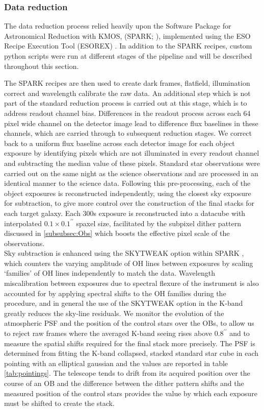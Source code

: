 \documentclass[fleqn,usenatbib]{mn2e}
\begin{document}
\subsubsection{Data reduction}\label{subsubsec:datareduction}
The data reduction process relied heavily upon the Software Package for Astronomical Reduction with KMOS, (SPARK; \cite{Davies2013}), implemented using the ESO Recipe Execution Tool (ESOREX) \citep{Freudling2013}.
In addition to the SPARK recipes, custom python scripts were run at different stages of the pipeline and will be described throughout this section.

The SPARK recipes are then used to create dark frames, flatfield, illumination correct and wavelength calibrate the raw data.
An additional step which is not part of the standard reduction process is carried out at this stage, which is to address readout channel bias.
Differences in the readout process across each 64 pixel wide channel on the detector image lead to difference flux baselines in these channels, which are carried through to subsequent reduction stages.
We correct back to a uniform flux baseline across each detector image for each object exposure by identifying pixels which are not illuminated in every readout channel and subtracting the median value of these pixels.
Standard star observations were carried out on the same night as the science observations and are processed in an identical manner to the science data.
Following this pre-processing, each of the object exposures is reconstructed independently, using the closest sky exposure for subtraction, to give more control over the construction of the final stacks for each target galaxy.
Each 300s exposure is reconstructed into a datacube with interpolated $0.1\times0.1^{\prime\prime}$ spaxel size, facilitated by the subpixel dither pattern discussed in \cref{subsubsec:Obs} which boosts the effective pixel scale of the observations. \\

Sky subtraction is enhanced using the SKYTWEAK option within SPARK \citep{Davies2007}, which counters the varying amplitude of OH lines between exposures by scaling `families' of OH lines independently to match the data.
Wavelength miscalibration between exposures due to spectral flexure of the instrument is also accounted for by applying spectral shifts to the OH families during the procedure, and in general the use of the SKYTWEAK option in the K-band greatly reduces the sky-line residuals. 
We monitor the evolution of the atmospheric PSF and the position of the control stars over the OBs, to allow us to reject raw frames where the averaged K-band seeing rises above $0.8^{\prime\prime}$ and to measure the spatial shifts required for the final stack more precisely.
The PSF is determined from fitting the K-band collapsed, stacked standard star cube in each pointing with an elliptical gaussian and the values are reported in table \ref{tab:pointings}.
The telescope tends to drift from its acquired position over the course of an OB and the difference between the dither pattern shifts and the measured position of the control stars provides the value by which each exposure must be shifted to create the stack. \\
\end{document}
